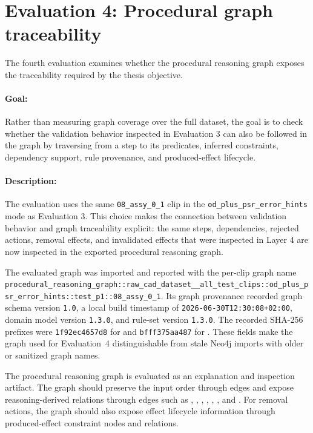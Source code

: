 \section{Evaluation 4: Procedural graph traceability}
\label{sec:evaluation-graph-traceability}

The fourth evaluation examines whether the procedural reasoning graph exposes the
traceability required by the thesis objective.

\paragraph{Goal:}
Rather than measuring graph coverage over the full dataset, the goal is to check
whether the validation behavior inspected in Evaluation 3 can also be followed in
the graph by traversing from a step to its predicates, inferred constraints,
dependency support, rule provenance, and produced-effect lifecycle.

\paragraph{Description:}
The evaluation uses the same \texttt{08\_assy\_0\_1} clip in the
\texttt{od\_plus\_psr\_error\_hints} mode as Evaluation 3. This choice makes the
connection between validation behavior and graph traceability explicit: the same
steps, dependencies, rejected actions, removal effects, and invalidated effects
that were inspected in Layer 4 are now inspected in the exported procedural
reasoning graph.

The evaluated graph was imported and reported with the per-clip graph name
\texttt{procedural\_reasoning\_graph::raw\_cad\_dataset\_\_all\_test\_clips::od\_plus\_psr\_error\_hints::test\_p1::08\_assy\_0\_1}.
Its graph provenance recorded graph schema version \texttt{1.0}, a local build
timestamp of \texttt{2026-06-30T12:30:08+02:00}, domain model version
\texttt{1.3.0}, and rule-set version \texttt{1.3.0}. The recorded SHA-256
prefixes were \texttt{1f92ec4657d8} for  and
\texttt{bfff375aa487} for . These fields make the
graph used for Evaluation~4 distinguishable from stale Neo4j imports with older
or sanitized graph names.

The procedural reasoning graph is evaluated as an explanation and inspection
artifact. The graph should preserve the input order through  edges
and expose reasoning-derived relations through edges such as ,
, , ,
, , and .
For removal actions, the graph should also expose effect lifecycle information
through produced-effect constraint nodes and  relations.

